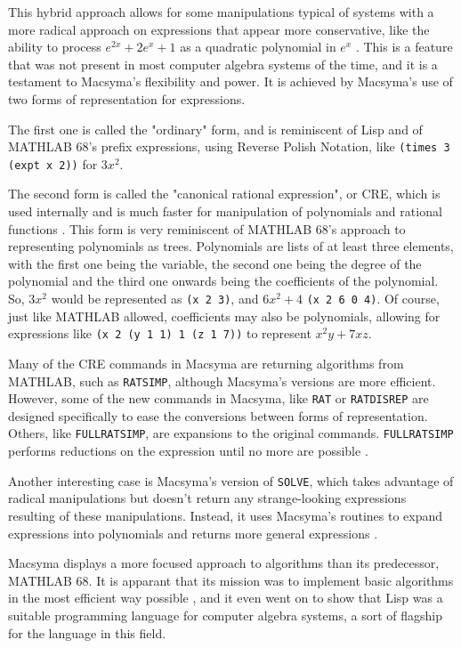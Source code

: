 This hybrid approach allows for some manipulations typical of systems with a more radical approach on expressions that appear more conservative, like the ability to process $e^{2x} + 2e^{x} + 1$ as a quadratic polynomial in $e^{x}$ \parencite{martin1971macsyma}. This is a feature that was not present in most computer algebra systems of the time, and it is a testament to Macsyma's flexibility and power. It is achieved by Macsyma's use of two forms of representation for expressions.

The first one is called the "ordinary" form, and is reminiscent of Lisp and of MATHLAB 68's prefix expressions, using Reverse Polish Notation, like \verb|(times 3 (expt x 2))| for $3x^2$.

The second form is called the "canonical rational expression", or CRE, which is used internally and is much faster for manipulation of polynomials and rational functions \parencite{martin1971macsyma}. This form is very reminiscent of MATHLAB 68's approach to representing polynomials as trees. Polynomials are lists of at least three elements, with the first one being the variable, the second one being the degree of the polynomial and the third one onwards being the coefficients of the polynomial. So, $3x^2$ would be represented as \verb|(x 2 3)|, and $6x^2 + 4$ \verb|(x 2 6 0 4)|. Of course, just like MATHLAB allowed, coefficients may also be polynomials, allowing for expressions like \verb|(x 2 (y 1 1) 1 (z 1 7))| to represent $x^2y + 7xz$.

Many of the CRE commands in Macsyma are returning algorithms from MATHLAB, such as \verb|RATSIMP|, although Macsyma's versions are more efficient. However, some of the new commands in Macsyma, like \verb|RAT| or \verb|RATDISREP| are designed specifically to ease the conversions between forms of representation. Others, like \verb|FULLRATSIMP|, are expansions to the original commands. \verb|FULLRATSIMP| performs reductions on the expression until no more are possible \parencite{martin1971macsyma}.

Another interesting case is Macsyma's version of \verb|SOLVE|, which takes advantage of radical manipulations but doesn't return any strange-looking expressions resulting of these manipulations. Instead, it uses Macsyma's routines to expand expressions into polynomials and returns more general expressions \parencite{martin1971macsyma}.

Macsyma displays a more focused approach to algorithms than its predecessor, MATHLAB 68. It is apparant that its mission was to implement basic algorithms in the most efficient way possible \parencite{martin1971macsyma}, and it even went on to show that Lisp was a suitable programming language for computer algebra systems, a sort of flagship for the language in this field.

